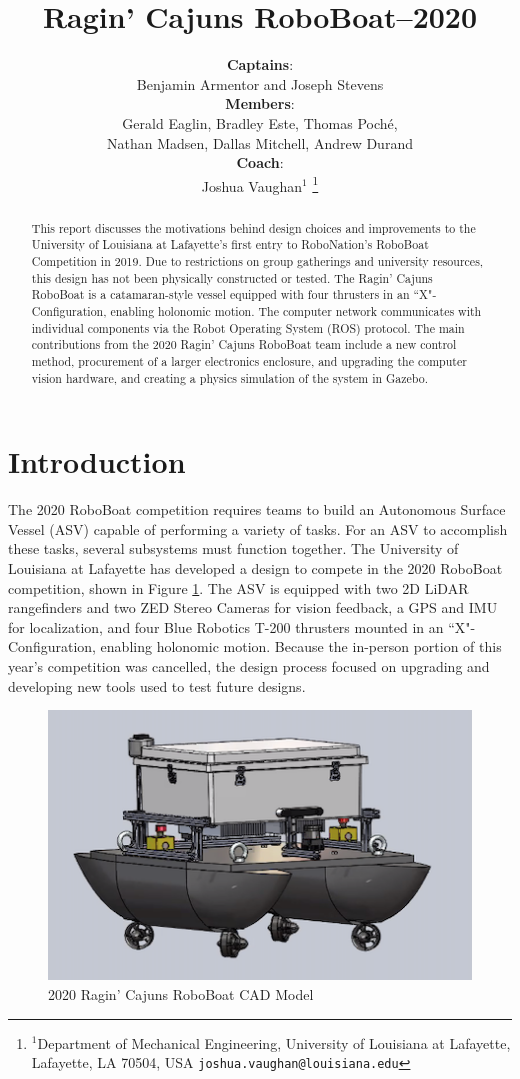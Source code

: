 \documentclass[letterpaper, 12 pt, conference]{ieeeconf}
\title{\LARGE \bf Ragin' Cajuns RoboBoat--2020}
\author{\textbf{Captains}:\\Benjamin Armentor and Joseph Stevens\\
\textbf{Members}:\\Gerald Eaglin, Bradley Este, Thomas Poché, \\Nathan Madsen, Dallas Mitchell, Andrew Durand\\
\textbf{Coach}:\\Joshua Vaughan$^{1}$%
\thanks{$^{1}$Department of Mechanical Engineering,
        University of Louisiana at Lafayette, Lafayette, LA 70504, USA
        {\tt\small joshua.vaughan@louisiana.edu}}%
}
\begin{document}
\maketitle
\thispagestyle{fancyplain}
\begin{abstract}
This report discusses the motivations behind design choices and improvements to the University of Louisiana at Lafayette's first entry to RoboNation's RoboBoat Competition in 2019. Due to restrictions on group gatherings and university resources, this design has not been physically constructed or tested.  The Ragin' Cajuns RoboBoat is a catamaran-style vessel equipped with four thrusters in an ``X"-Configuration, enabling holonomic motion. The computer network communicates with individual components via the Robot Operating System (ROS) protocol. The main contributions from the 2020 Ragin' Cajuns RoboBoat team include a new control method, procurement of a larger electronics enclosure, and upgrading the computer vision hardware, and creating a physics simulation of the system in Gazebo.
\end{abstract}
\section{Introduction}
The 2020 RoboBoat competition requires teams to build an Autonomous Surface Vessel (ASV) capable of performing a variety of tasks. For an ASV to accomplish these tasks, several subsystems must function together. The University of Louisiana at Lafayette has developed a design to compete in the 2020 RoboBoat competition, shown in Figure \ref{fig:RoboBoat}. The ASV is equipped with two 2D LiDAR rangefinders and two ZED Stereo Cameras for vision feedback, a GPS and IMU for localization, and four Blue Robotics T-200 thrusters mounted in an ``X"-Configuration, enabling holonomic motion. Because the in-person portion of this year's competition was cancelled, the design process focused on upgrading and developing new tools used to test future designs.
%
\begin{figure}[tb]
\centering
\includegraphics[width=\columnwidth]{Figures/RoboBoat.png}
\caption{2020 Ragin' Cajuns RoboBoat CAD Model}
\label{fig:RoboBoat}
\end{figure}
%
\end{document}
